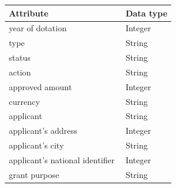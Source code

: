\documentclass[thesis=B,english]{FITthesis}[2012/06/26]
\begin{document}
    \begin{center}
        \begin{tabular}{  p{0.7\linewidth} | p{0.3\linewidth} }
        Attribute & Data type\\ \hline
        year of dotation & Integer \\
        type & String \\
        status & String \\
        action & String \\
        approved amount & Integer \\
        currency & String \\
        applicant & String \\
        applicant's address & Integer \\
        applicant's city & String \\
        applicant's national identifier & Integer \\
        grant purpose & String \\
        \end{tabular}
    \end{center}	
	
\begin{conclusion}
\end{conclusion}
\end{document}
